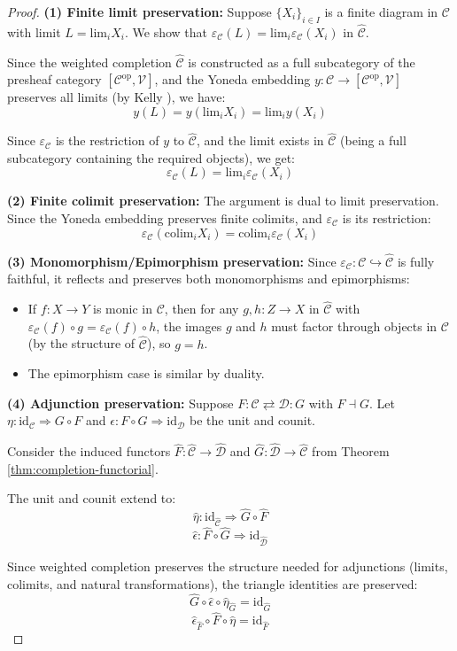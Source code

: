 \documentclass[11pt]{article}
\theoremstyle{plain}
\theoremstyle{definition}
\theoremstyle{remark}
\newcommand{\V}{\mathcal{V}}
\newcommand{\C}{\mathcal{C}}
\newcommand{\D}{\mathcal{D}}
\newcommand{\op}{\mathrm{op}}
\newcommand{\colim}{\mathrm{colim}}
\renewcommand{\lim}{\mathrm{lim}}
\newcommand{\wh}[1]{\widehat{#1}}
\begin{document}
\begin{proof}
\textbf{(1) Finite limit preservation:}
Suppose $\{X_i\}_{i \in I}$ is a finite diagram in $\C$ with limit $L = \lim_i X_i$. We show that $\varepsilon_\C(L) = \lim_i \varepsilon_\C(X_i)$ in $\wh{\C}$.

Since the weighted completion $\wh{\C}$ is constructed as a full subcategory of the presheaf category $[\C^{\op}, \V]$, and the Yoneda embedding $y : \C \to [\C^{\op}, \V]$ preserves all limits (by Kelly \cite{kelly1982basic}), we have:
$$y(L) = y(\lim_i X_i) = \lim_i y(X_i)$$

Since $\varepsilon_\C$ is the restriction of $y$ to $\wh{\C}$, and the limit exists in $\wh{\C}$ (being a full subcategory containing the required objects), we get:
$$\varepsilon_\C(L) = \lim_i \varepsilon_\C(X_i)$$

\textbf{(2) Finite colimit preservation:}
The argument is dual to limit preservation. Since the Yoneda embedding preserves finite colimits, and $\varepsilon_\C$ is its restriction:
$$\varepsilon_\C(\colim_i X_i) = \colim_i \varepsilon_\C(X_i)$$

\textbf{(3) Monomorphism/Epimorphism preservation:}
Since $\varepsilon_\C : \C \hookrightarrow \wh{\C}$ is fully faithful, it reflects and preserves both monomorphisms and epimorphisms:
\begin{itemize}
\item If $f : X \to Y$ is monic in $\C$, then for any $g, h : Z \to X$ in $\wh{\C}$ with $\varepsilon_\C(f) \circ g = \varepsilon_\C(f) \circ h$, the images $g$ and $h$ must factor through objects in $\C$ (by the structure of $\wh{\C}$), so $g = h$.
\item The epimorphism case is similar by duality.
\end{itemize}

\textbf{(4) Adjunction preservation:}
Suppose $F : \C \rightleftarrows \D : G$ with $F \dashv G$. Let $\eta : \text{id}_\C \Rightarrow G \circ F$ and $\epsilon : F \circ G \Rightarrow \text{id}_\D$ be the unit and counit.

Consider the induced functors $\wh{F} : \wh{\C} \to \wh{\D}$ and $\wh{G} : \wh{\D} \to \wh{\C}$ from Theorem \ref{thm:completion-functorial}.

The unit and counit extend to:
$$\wh{\eta} : \text{id}_{\wh{\C}} \Rightarrow \wh{G} \circ \wh{F}$$
$$\wh{\epsilon} : \wh{F} \circ \wh{G} \Rightarrow \text{id}_{\wh{\D}}$$

Since weighted completion preserves the structure needed for adjunctions (limits, colimits, and natural transformations), the triangle identities are preserved:
$$\wh{G} \circ \wh{\epsilon} \circ \wh{\eta}_{\wh{G}} = \text{id}_{\wh{G}}$$
$$\wh{\epsilon}_{\wh{F}} \circ \wh{F} \circ \wh{\eta} = \text{id}_{\wh{F}}$$


\end{proof}
\end{document}
